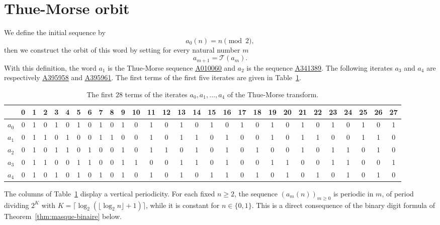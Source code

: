 \documentclass[12pt,reqno]{article}
\newcommand{\seqnum}[1]{\href{https://oeis.org/#1}{\rm \underline{#1}}}
\theoremstyle{plain}
\theoremstyle{definition}
\begin{document}
\section{Thue-Morse orbit}
\label{sec:orbit}

We define the initial sequence by
\[
  a_0(n) = n \pmod 2,
\]
then we construct the orbit of this word by setting for every natural number $m$
\[
  a_{m+1} = \mathcal{T}(a_m).
\]
With this definition, the word $a_1$ is the Thue-Morse sequence \seqnum{A010060} and $a_2$ is the sequence \seqnum{A341389}. The following iterates $a_3$ and $a_4$ are respectively \seqnum{A395958} and \seqnum{A395961}. The first terms of the first five iterates are given in Table~\ref{tab:orbite}.

\begin{table}[H]
\centering
\small
\setlength{\tabcolsep}{3pt}
\begin{tabular}{c|cccccccccccccccccccccccccccc}
 & 0 & 1 & 2 & 3 & 4 & 5 & 6 & 7 & 8 & 9 & 10 & 11 & 12 & 13 & 14 & 15 & 16 & 17 & 18 & 19 & 20 & 21 & 22 & 23 & 24 & 25 & 26 & 27 \\
\hline
$a_{0}$ & 0 & 1 & 0 & 1 & 0 & 1 & 0 & 1 & 0 & 1 & 0 & 1 & 0 & 1 & 0 & 1 & 0 & 1 & 0 & 1 & 0 & 1 & 0 & 1 & 0 & 1 & 0 & 1 \\
$a_{1}$ & 0 & 1 & 1 & 0 & 1 & 0 & 0 & 1 & 1 & 0 & 0 & 1 & 0 & 1 & 1 & 0 & 1 & 0 & 0 & 1 & 0 & 1 & 1 & 0 & 0 & 1 & 1 & 0 \\
$a_{2}$ & 0 & 1 & 0 & 1 & 1 & 0 & 1 & 0 & 0 & 1 & 0 & 1 & 1 & 0 & 1 & 0 & 1 & 0 & 1 & 0 & 0 & 1 & 0 & 1 & 1 & 0 & 1 & 0 \\
$a_{3}$ & 0 & 1 & 1 & 0 & 0 & 1 & 1 & 0 & 0 & 1 & 1 & 0 & 0 & 1 & 1 & 0 & 1 & 0 & 0 & 1 & 1 & 0 & 0 & 1 & 1 & 0 & 0 & 1 \\
$a_{4}$ & 0 & 1 & 0 & 1 & 0 & 1 & 0 & 1 & 0 & 1 & 0 & 1 & 0 & 1 & 0 & 1 & 1 & 0 & 1 & 0 & 1 & 0 & 1 & 0 & 1 & 0 & 1 & 0 \\
\end{tabular}
\caption{The first $28$ terms of the iterates $a_0, a_1, \ldots, a_4$ of the Thue-Morse transform.}
\label{tab:orbite}
\end{table}

The columns of Table~\ref{tab:orbite} display a vertical periodicity.
For each fixed $n \ge 2$, the sequence $(a_m(n))_{m \ge 0}$ is
periodic in $m$, of period dividing $2^K$ with
$K = \lceil \log_2(\lfloor \log_2 n \rfloor + 1) \rceil$, while it is
constant for $n \in \{0,1\}$. This is a direct consequence of the binary digit formula of Theorem~\ref{thm:masque-binaire} below.
\end{document}
